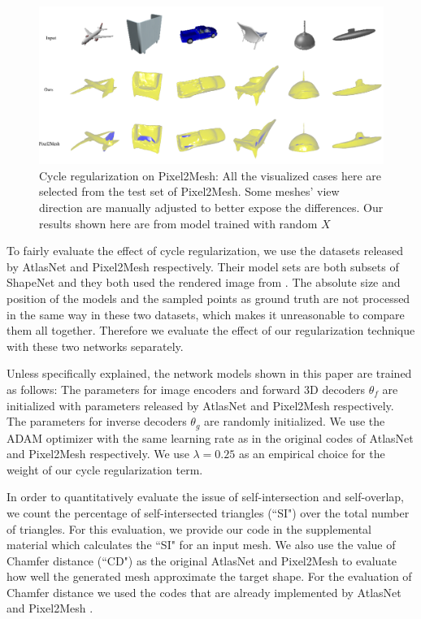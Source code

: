 \begin{figure}[t]
	\centering
	\includegraphics[width=\linewidth]{img/p2m/final}
	\caption{Cycle regularization on Pixel2Mesh: All the visualized cases here are selected from the test set of Pixel2Mesh. Some meshes' view direction are manually adjusted to better expose the differences. Our results shown here are from model trained with random $X$}
	\label{fig:p2m}
\end{figure}
 To fairly evaluate the effect of cycle regularization, we use the datasets released by AtlasNet and Pixel2Mesh respectively. Their model sets are both subsets of ShapeNet \cite{shapenetdata} and they both used the rendered image from \cite{3DR2N2}. The absolute size and position of the models and the sampled points as ground truth are not processed in the same way in these two datasets, which makes it unreasonable to compare them all together. Therefore we evaluate the effect of our regularization technique with these two networks separately.

Unless specifically explained, the network models shown in this paper are trained as follows: The parameters for image encoders and forward 3D decoders $\theta_f$ are initialized with parameters released by AtlasNet \cite{atlasnet} and Pixel2Mesh \cite{pixel2mesh} respectively. The parameters for inverse decoders $\theta_g$ are randomly initialized. We use the ADAM \cite{adam} optimizer with the same learning rate as in the original codes of AtlasNet and Pixel2Mesh respectively. We use $\lambda=0.25$ as an empirical choice for the weight of our cycle regularization term.

In order to quantitatively evaluate the issue of self-intersection and self-overlap, we count the percentage of self-intersected triangles (``SI") over the total number of triangles. For this evaluation, we provide our code in the supplemental material which calculates the ``SI" for an input mesh.  
We also use the value of Chamfer distance (``CD") as the original AtlasNet and Pixel2Mesh to evaluate how well the generated mesh approximate the target shape. For the evaluation of Chamfer distance we used the codes that are already implemented by AtlasNet \cite{atlasnet} and Pixel2Mesh \cite{pixel2mesh}.

